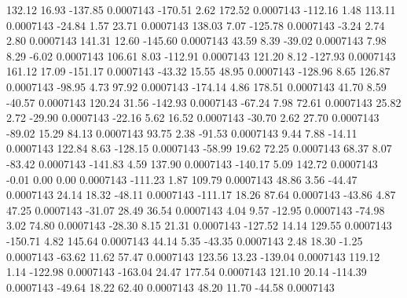       132.12       16.93     -137.85     0.0007143
     -170.51        2.62      172.52     0.0007143
     -112.16        1.48      113.11     0.0007143
      -24.84        1.57       23.71     0.0007143
      138.03        7.07     -125.78     0.0007143
       -3.24        2.74        2.80     0.0007143
      141.31       12.60     -145.60     0.0007143
       43.59        8.39      -39.02     0.0007143
        7.98        8.29       -6.02     0.0007143
      106.61        8.03     -112.91     0.0007143
      121.20        8.12     -127.93     0.0007143
      161.12       17.09     -151.17     0.0007143
      -43.32       15.55       48.95     0.0007143
     -128.96        8.65      126.87     0.0007143
      -98.95        4.73       97.92     0.0007143
     -174.14        4.86      178.51     0.0007143
       41.70        8.59      -40.57     0.0007143
      120.24       31.56     -142.93     0.0007143
      -67.24        7.98       72.61     0.0007143
       25.82        2.72      -29.90     0.0007143
      -22.16        5.62       16.52     0.0007143
      -30.70        2.62       27.70     0.0007143
      -89.02       15.29       84.13     0.0007143
       93.75        2.38      -91.53     0.0007143
        9.44        7.88      -14.11     0.0007143
      122.84        8.63     -128.15     0.0007143
      -58.99       19.62       72.25     0.0007143
       68.37        8.07      -83.42     0.0007143
     -141.83        4.59      137.90     0.0007143
     -140.17        5.09      142.72     0.0007143
       -0.01        0.00        0.00     0.0007143
     -111.23        1.87      109.79     0.0007143
       48.86        3.56      -44.47     0.0007143
       24.14       18.32      -48.11     0.0007143
     -111.17       18.26       87.64     0.0007143
      -43.86        4.87       47.25     0.0007143
      -31.07       28.49       36.54     0.0007143
        4.04        9.57      -12.95     0.0007143
      -74.98        3.02       74.80     0.0007143
      -28.30        8.15       21.31     0.0007143
     -127.52       14.14      129.55     0.0007143
     -150.71        4.82      145.64     0.0007143
       44.14        5.35      -43.35     0.0007143
        2.48       18.30       -1.25     0.0007143
      -63.62       11.62       57.47     0.0007143
      123.56       13.23     -139.04     0.0007143
      119.12        1.14     -122.98     0.0007143
     -163.04       24.47      177.54     0.0007143
      121.10       20.14     -114.39     0.0007143
      -49.64       18.22       62.40     0.0007143
       48.20       11.70      -44.58     0.0007143
